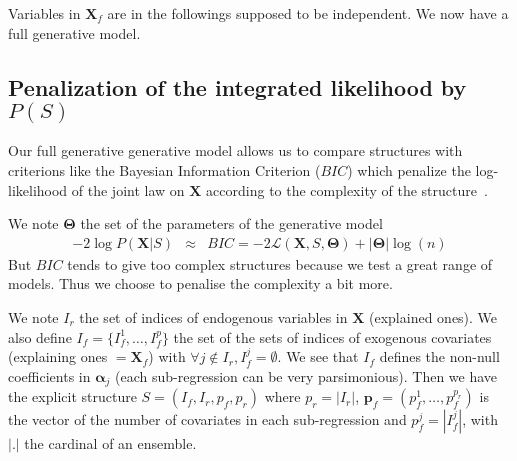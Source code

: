 \documentclass[11pt,a4paper]{article}
\begin{document}
		Variables in $\boldsymbol{X}_f$ are in the followings supposed to be independent.
	We now have a full generative model.
	
	\subsection{Penalization of the integrated likelihood by $P(S)$} \label{compstruct}

  Our full generative generative model allows us to compare structures with criterions like the Bayesian Information Criterion ($BIC$) which penalize the log-likelihood of the joint law on $\boldsymbol{X}$ according to the complexity of the structure~\cite{BIChuard}. 

	We note $\boldsymbol{\Theta}$ the set of the parameters of the generative model
	\begin{eqnarray}
		-2\log P(\boldsymbol{X}|S)&\approx & BIC=-2\mathcal{L}(\boldsymbol{X},S,\boldsymbol{\Theta})+|\boldsymbol{\Theta}|\log(n)  
	\end{eqnarray}
	But $BIC$ tends to give too complex structures because we test a great range of models. Thus we choose to penalise the complexity a bit more.
	
	We note $I_r$ the set of indices of endogenous variables in $\boldsymbol{X}$ (explained ones).
We also define $I_f=\{I_f^1,\dots,I_f^p \}$ the set of the sets of indices of exogenous covariates (explaining ones $=\boldsymbol{X}_f$) with $\forall j \notin I_r, I_f^j=\emptyset$. 
We see that $I_f$ defines the non-null coefficients in $\boldsymbol{\alpha}_j$ (each sub-regression can be very parsimonious).
Then we have the explicit structure $S=(I_f,I_r,p_f,p_r)$ where $p_r=|I_r|$, $\boldsymbol{p}_f=(p_f^1,\dots,p_f^{p_r})$ is the vector of the number of covariates in each sub-regression  and $p_f^j=|I_f^j|$, with $|.|$ the cardinal of an ensemble.
\end{document}
